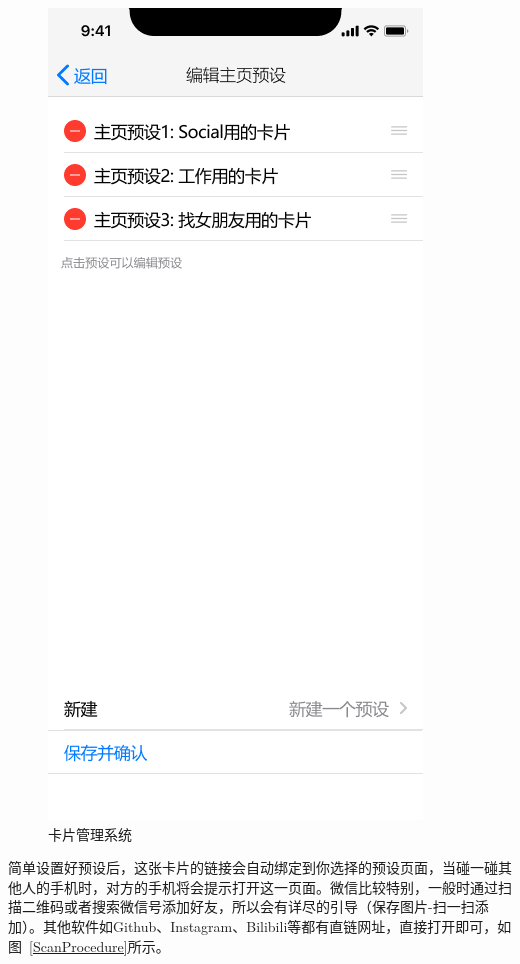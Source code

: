 \documentclass[UTF8]{ctexart}
\begin{document}
\begin{figure}[htbp]
{\begin{minipage}[b]{.3\linewidth}
            \includegraphics[scale=0.3]{EditHomepagePreset.png}
        \end{minipage}
    }
    \caption{卡片管理系统}
    \label{CardManageSystem}
\end{figure}

简单设置好预设后，这张卡片的链接会自动绑定到你选择的预设页面，当碰一碰其他人的手机时，对方的手机将会提示打开这一页面。微信比较特别，一般时通过扫描二维码或者搜索微信号添加好友，所以会有详尽的引导（保存图片-扫一扫添加）。其他软件如Github、Instagram、Bilibili等都有直链网址，直接打开即可，如图~\ref{ScanProcedure}所示。
\end{document}

